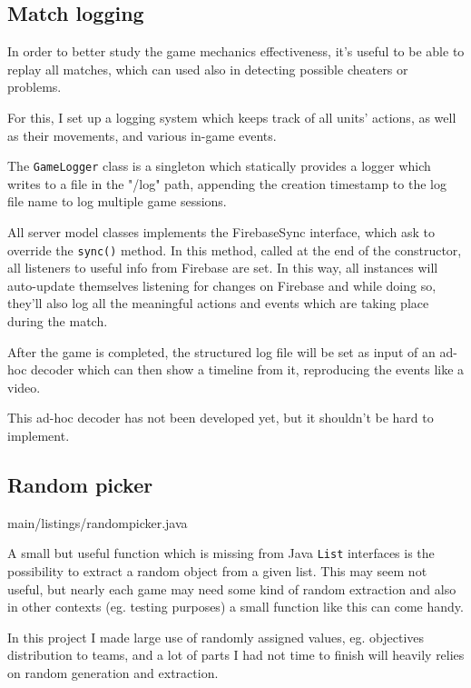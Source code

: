 		\subsection{Match logging}\label{focus:log}
		
			In order to better study the game mechanics effectiveness, it's useful to be able to replay all matches, which can used also in detecting possible cheaters or problems.
			
			For this, I set up a logging system which keeps track of all units' actions, as well as their movements, and various in-game events.
			
			The \lstinline|GameLogger| class is a singleton which statically provides a logger which writes to a file in the "/log" path, appending the creation timestamp to the log file name to log multiple game sessions.
			
			All server model classes implements the FirebaseSync interface, which ask to override the \lstinline|sync()| method.
			In this method, called at the end of the constructor, all listeners to useful info from Firebase are set.
			In this way, all instances will auto-update themselves listening for changes on Firebase and while doing so, they'll also log all the meaningful actions and events which are taking place during the match.
			
			After the game is completed, the structured log file will be set as input of an ad-hoc decoder which can then show a timeline from it, reproducing the events like a video.
			
			This ad-hoc decoder has not been developed yet, but it shouldn't be hard to implement. 
		
		\subsection{Random picker}\label{focus:picker}
		
			
							{main/listings/randompicker.java}
			
			A small but useful function which is missing from Java \lstinline|List| interfaces is the possibility to extract a random object from a given list.
			This may seem not useful, but nearly each game may need some kind of random extraction and also in other contexts (eg. testing purposes) a small function like this can come handy.
			
			In this project I made large use of randomly assigned values, eg. objectives distribution to teams, and a lot of parts I had not time to finish will heavily relies on random generation and extraction.
			
